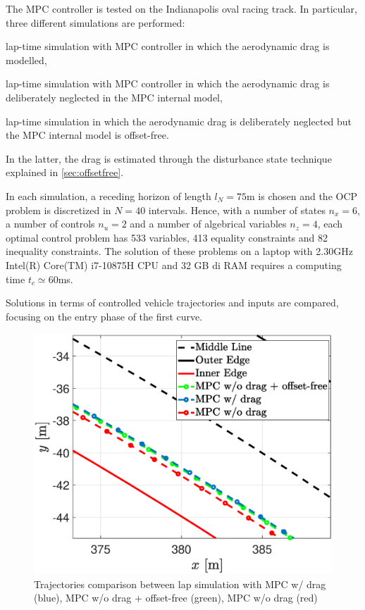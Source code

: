 \documentclass[conference]{IEEEtran} %
\begin{document}
The MPC controller is tested on the Indianapolis oval racing track. In particular, three different simulations are performed:
\begin{enumerate*}[label=(\roman*)]
	\item lap-time simulation with MPC controller in which the aerodynamic drag is modelled,
	\item lap-time simulation with MPC controller in which the aerodynamic drag is deliberately neglected in the MPC internal model,
	\item lap-time simulation in which the aerodynamic drag is deliberately neglected but the MPC internal model is offset-free.
\end{enumerate*}
In the latter, the drag is estimated through the disturbance state technique explained in \ref{sec:offsetfree}.

In each simulation, a receding horizon of length $l_N = 75$m is chosen and the OCP problem is discretized in $N = 40$ intervals. Hence, with a number of states $n_x = 6$, a number of controls $n_u = 2$ and a number of algebrical variables $n_z = 4$, each optimal control problem has 533 variables, 413 equality constraints and 82 inequality constraints. The solution of these problems on a laptop with 2.30GHz
Intel(R) Core(TM) i7-10875H CPU and 32 GB di RAM requires a computing time $t_c \simeq 60$ms.

Solutions in terms of controlled vehicle trajectories and inputs are compared, focusing on the entry phase of the first curve.

\begin{figure}[htb] \centering
    \includegraphics[width=1.\linewidth]{Trajectories2}
	\caption{Trajectories comparison between lap simulation with MPC w/ drag (blue), MPC w/o drag + offset-free (green), MPC w/o drag (red)}
	\label{fig:Trajectories2}
\end{figure}
\end{document}
